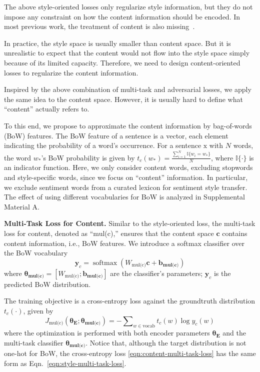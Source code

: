 \documentclass[11pt,a4paper]{article}
\newcommand{\rmx}{\mathrm x}
\newcommand{\loss}[1]{J_{\text{#1}}}
\newcommand{\nnweight}[1]{\bm{\theta_{\text{#1}}}}
\newcommand{\weight}[1]{W_{\text{#1}}}
\newcommand{\bias}[1]{\bm{b_{\text{#1}}}}
\begin{document}
The above style-oriented losses only regularize style information, but they do not impose any constraint on how the content information should be encoded. In most previous work, the treatment of content is also missing~\cite{hu2017toward,shen2017style,fu2018style}.

In practice, the style space is usually smaller than content space. But it is unrealistic to expect that the content would not flow into the style space simply because of its limited capacity. Therefore, we need to design content-oriented losses to regularize the content information.

Inspired by the above combination of multi-task and adversarial losses, we apply the same idea to the content space. However, it is usually hard to define what ``content'' actually refers to.

To this end, we propose to approximate the content information by bag-of-words (BoW) features.
The BoW feature of a sentence is a vector, each element indicating the probability of a word's occurrence.
For a sentence $\rmx$ with $N$ words, the word $w_*$'s BoW probability is given by
$t_c(w_*)=\frac{\sum_{i=1}^{N}{\mathbb{I}\{w_i = w_*\}}}{N}$,
where $\mathbb{I\{\cdot\}}$ is an indicator function.
Here, we only consider content words, excluding stopwords and style-specific words, since we focus on ``content'' information. In particular, we exclude sentiment words from a curated lexicon \cite{hu2004mining} for sentiment style transfer.
{\color{red} The effect of using different vocabularies for BoW is analyzed in Supplemental Material A.}

\textbf{Multi-Task Loss for Content.} Similar to the style-oriented loss, the multi-task loss for content, denoted as ``mul(c),'' ensures that the content space $\bm c$ contains content information, i.e., BoW features.
We introduce a softmax classifier over the BoW vocabulary
\begin{equation} \label{eqn:bow-pred}
	\bm y_c = \operatorname{softmax}({\weight{mul(c)}} \bm c + \bias{mul(c)})
\end{equation}
where $\nnweight{mul(c)}\!\!=\!\![\weight{mul(c)}; \bias{mul(c)}]$ are the classifier's parameters; $\bm y_c$ is the predicted BoW distribution.

The training objective is a cross-entropy loss against the groundtruth distribution $t_c(\cdot)$, given by
\begin{equation}\label{eqn:content-multi-task-loss}
	\loss{mul(c)}(\nnweight{E};\nnweight{mul(c)}) = -\!\! \sum\nolimits_{w\in\text{vocab}}\!\! t_c(w)\log y_c(w)
\end{equation}
where the optimization is performed with both encoder parameters $\nnweight{E}$ and the multi-task classifier $\nnweight{mul(c)}$.
Notice that, although the target distribution is not one-hot  for BoW, the cross-entropy loss \ref{eqn:content-multi-task-loss} has the same form as Eqn.~\ref{eqn:style-multi-task-loss}.
\end{document}
